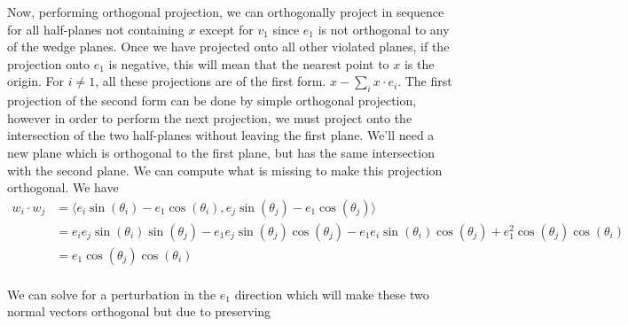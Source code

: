 Now, performing orthogonal projection,
we can orthogonally project in sequence for all half-planes not
containing $x$ except for $v_1$ since $e_1$ is not orthogonal to any
of the wedge planes. Once we have projected onto all other violated
planes, if the projection onto $e_1$ is negative, this will mean that
the nearest point to $x$ is the origin. For $i \neq 1$, all these
projections are of the first form. $x - \sum_{i} x \cdot e_i$. The
first projection of the second form can be done by simple orthogonal
projection, however in order to perform the next projection, we must
project onto the intersection of the two half-planes without leaving
the first plane. We'll need a new plane which is orthogonal to the
first plane, but has the same intersection with the second plane. We
can compute what is missing to make this projection orthogonal. We
have
\begin{align}
  w_i \cdot w_j &= \langle e_i \sin(\theta_i) - e_1 \cos(\theta_i), e_j
                  \sin(\theta_j) - e_1 \cos(\theta_j)\rangle\\
                &= e_ie_j\sin(\theta_i)\sin(\theta_j) -
                  e_1e_j\sin(\theta_j)\cos(\theta_j) - e_1e_i
                  \sin(\theta_i)\cos(\theta_j) +
                  e_1^2\cos(\theta_j)\cos(\theta_i)\\
                &= e_1 \cos(\theta_j)\cos(\theta_i)\\
\end{align}

We can solve for a perturbation in the $e_1$ direction which will make
these two normal vectors orthogonal but due to preserving 



